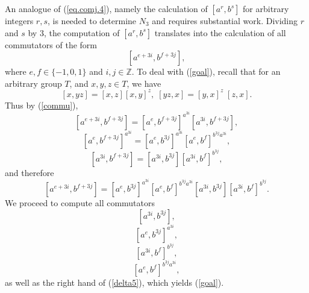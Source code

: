 \documentclass{amsart}
\theoremstyle{definition}
\theoremstyle{remark}
\newcommand \Z{{\mathbb Z}}
\begin{document}
{An analogue of (\ref{eq.comj.4}), namely the calculation of $[a^r,b^s]$ for arbitrary integers $r,s$, is needed to determine $N_3$
and requires substantial work. Dividing $r$ and $s$ by 3, the computation of $[a^r,b^s]$
translates into the calculation of all commutators of the form
\begin{equation}
\label{goal}
[a^{e+3i},b^{f+3j}],
\end{equation}
where $e,f\in\{-1,0,1\}$ and $i,j\in\Z$. To deal with (\ref{goal}), 
recall that for an arbitrary group $T$, and $x,y,z\in T$, we have
\begin{equation}
\label{commu}
[x,yz]=[x,z][x,y]^z,\; [yz,x]=[y,x]^z\; [z,x].
\end{equation}
Thus by (\ref{commu}), 
\begin{equation}
\label{exp1}
[a^{e+3i},b^{f+3j}]=[a^{e},b^{f+3j}]^{a^{3i}}[a^{3i},b^{f+3j}],
\end{equation}
\begin{equation}
\label{exp2}
[a^{e},b^{f+3j}]^{a^{3i}}=[a^{e},b^{3j}]^{a^{3i}}[a^{e},b^{f}]^{b^{3j}a^{3i}},
\end{equation}
\begin{equation}
\label{exp3}
[a^{3i},b^{f+3j}]=[a^{3i},b^{3j}][a^{3i},b^{f}]^{b^{3j}},
\end{equation}
and therefore
\begin{equation}
\label{delta5}
[a^{e+3i},b^{f+3j}]=[a^{e},b^{3j}]^{a^{3i}}[a^{e},b^{f}]^{b^{3j}a^{3i}}[a^{3i},b^{3j}][a^{3i},b^{f}]^{b^{3j}}.
\end{equation}
We proceed to compute all commutators
\begin{equation}
\label{exp4}
[a^{3i},b^{3j}],
\end{equation}
\begin{equation}
\label{exp5}
[a^{e},b^{3j}]^{a^{3i}},
\end{equation}
\begin{equation}
\label{exp6}
[a^{3i},b^{f}]^{b^{3j}},
\end{equation}
\begin{equation}
\label{exp7}
[a^{e},b^{f}]^{b^{3j}a^{3i}},
\end{equation}
as well as the right hand of (\ref{delta5}), which yields (\ref{goal}).


}
\end{document}
